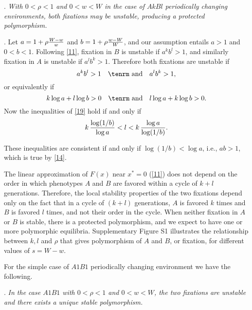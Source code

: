 \documentclass[9pt,twocolumn,twoside,lineno]{pnas-new}
\begin{document}
. {\sl With $0<\rho<1$ and $0<w<W$ in the case of $AkBl$ periodically changing environments, both fixations may be unstable, producing a protected polymorphism.}\par
\medskip

. Let $a=1+\rho{W-w\over w}$ and $b=1+\rho{w-W\over W}$, and our assumption entails  $a>1$ and $0<b<1$. Following \eqref{11}, fixation in $B$ is unstable if $a^kb^l>1$, and similarly  fixation in $A$ is unstable if $a^lb^k>1$. Therefore both fixations are unstable if
\begin{equation}a^kb^l>1\quad\hbox{\tenrm and}\quad a^lb^k>1,\label{18}\end{equation}
or equivalently if
\begin{equation}k\log a +l\log b>0\quad\hbox{\tenrm and}\quad l\log a+k\log b>0.\label{19}\end{equation}
Now the inequalities of \eqref{19} hold if and only if
\begin{equation}k\,{\log(1/b)\over\log a} < l < k\,{\log a\over\log(1/b)}.\label{20}\end{equation} 

These inequalities are consistent if and only if $\log(1/b)<\log a$, i.e., $ab>1$, which is true by \eqref{14}.

The linear approximation of $F(x)$ near $x^*=0$ (\eqref{11}) does not depend on the order in which phenotypes $A$ and $B$ are favored within a cycle of $k+l$ generations.
Therefore, the local stability properties of the two fixations depend only on the fact that in a cycle of $(k+l)$ generations, $A$ is favored $k$ times and $B$ is favored $l$ times, and not their order in the cycle. 
When neither fixation in $A$ or $B$ is stable, there is a protected polymorphism, and we expect to have one or more polymorphic equilibria. Supplementary Figure S1 illustrates the relationship between $k,l$ and $\rho$ that gives polymorphism of $A$ and $B$, or fixation, for different values of $s=W-w$. 

For the simple case of $A1B1$ periodically changing environment we have the following.
\medskip

. {\sl In the case $A1B1$ with $0<\rho<1$ and $0<w<W$, the two fixations are unstable and there exists a unique stable polymorphism.}\par
\medskip
\end{document}
